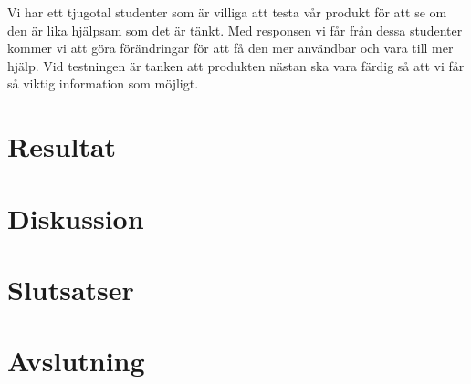 \documentclass[]{article}
\begin{document}
Vi har ett tjugotal studenter som är villiga att testa vår produkt för
att se om den är lika hjälpsam som det är tänkt. Med responsen vi får
från dessa studenter kommer vi att göra förändringar för att få den mer
användbar och vara till mer hjälp. Vid testningen är tanken att
produkten nästan ska vara färdig så att vi får så viktig information som
möjligt.

\section{Resultat}

%

\section{Diskussion}


\section{Slutsatser}

\section{Avslutning}

%

\newpage

\printbibliography
\end{document}
